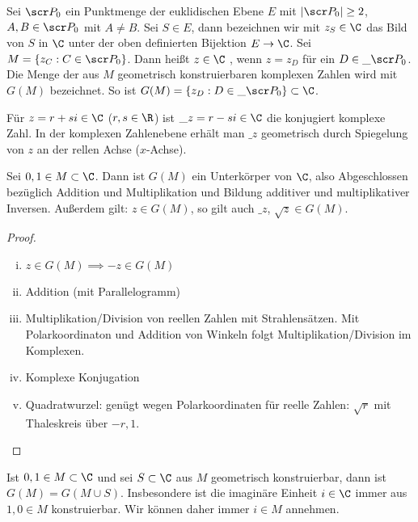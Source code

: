 \begin{df} \label{18.5-3}
	Sei $\scr P_0$ ein Punktmenge der euklidischen Ebene $E$ mit $|\scr P_0| \ge 2$, $A, B \in \scr P_0$ mit $A \neq B$.
	Sei $S \in E$, dann bezeichnen wir mit $z_S \in \C$ das Bild von $S$ in $\C$ unter der oben definierten Bijektion $E \to \C$.
	Sei $M = \{z_C : C \in \scr P_0\}$.
	Dann heißt $z \in \C$ , wenn $z = z_D$ für ein $D \in \_{\scr P_0}$.
	Die Menge der aus $M$ geometrisch konstruierbaren komplexen Zahlen wird mit $G(M)$ bezeichnet.
	So ist $G(M) = \{ z_D : D \in \_{\scr P_0} \} \subset \C$.
\end{df}

\begin{note}
	Für $z = r + si \in \C$ ($r, s \in \R$) ist $\_z = r - si \in \C$ die konjugiert komplexe Zahl.
	In der komplexen Zahlenebene erhält man $\_z$ geometrisch durch Spiegelung von $z$ an der rellen Achse ($x$-Achse).
\end{note}

\begin{st} \label{18.5-4}
	Sei $0, 1 \in M \subset \C$.
	Dann ist $G(M)$ ein Unterkörper von $\C$, also Abgeschlossen bezüglich Addition und Multiplikation und Bildung additiver und multiplikativer Inversen.
	Außerdem gilt: $z \in G(M)$, so gilt auch $\_z$, $\sqrt z \in G(M)$.
	\begin{proof}
		\begin{enumerate}[i)]
			\item
				$z \in G(M) \implies -z \in G(M)$
			\item
				Addition (mit Parallelogramm)
			\item
				Multiplikation/Division von reellen Zahlen mit Strahlensätzen.
				Mit Polarkoordinaton und Addition von Winkeln folgt Multiplikation/Division im Komplexen.
			\item
				Komplexe Konjugation
			\item
				Quadratwurzel:
				genügt wegen Polarkoordinaten für reelle Zahlen: $\sqrt{r}$ mit Thaleskreis über $-r, 1$.
		\end{enumerate}
	\end{proof}
\end{st}

Ist $0, 1 \in M \subset \C$ und sei $S \subset \C$ aus $M$ geometrisch konstruierbar, dann ist $G(M) = G(M \cup S)$.
Insbesondere ist die imaginäre Einheit $i \in \C$ immer aus $1, 0 \in M$ konstruierbar.
Wir können daher immer $i \in M$ annehmen.

